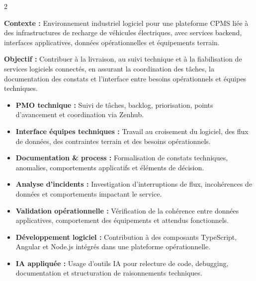 \documentclass[8pt,a4paper,ragged2e,withhyper]{altacv}
\begin{document}



\makecvheader
\vspace{-0.3cm}


\begin{paracol}{2}



\textbf{Contexte :} Environnement industriel logiciel pour une plateforme CPMS liée à des infrastructures de recharge de véhicules électriques, avec services backend, interfaces applicatives, données opérationnelles et équipements terrain.

\textbf{Objectif :} Contribuer à la livraison, au suivi technique et à la fiabilisation de services logiciels connectés, en assurant la coordination des tâches, la documentation des constats et l’interface entre besoins opérationnels et équipes techniques.

\begin{itemize}
  \item \textbf{PMO technique :} Suivi de tâches, backlog, priorisation, points d’avancement et coordination via Zenhub.
  \item \textbf{Interface équipes techniques :} Travail au croisement du logiciel, des flux de données, des contraintes terrain et des besoins opérationnels.
  \item \textbf{Documentation \& process :} Formalisation de constats techniques, anomalies, comportements applicatifs et éléments de décision.
  \item \textbf{Analyse d’incidents :} Investigation d’interruptions de flux, incohérences de données et comportements impactant le service.
  \item \textbf{Validation opérationnelle :} Vérification de la cohérence entre données applicatives, comportement des équipements et attendus fonctionnels.
  \item \textbf{Développement logiciel :} Contribution à des composants TypeScript, Angular et Node.js intégrés dans une plateforme opérationnelle.
  \item \textbf{IA appliquée :} Usage d’outils IA pour relecture de code, debugging, documentation et structuration de raisonnements techniques.
\end{itemize}


\end{paracol}
\end{document}
